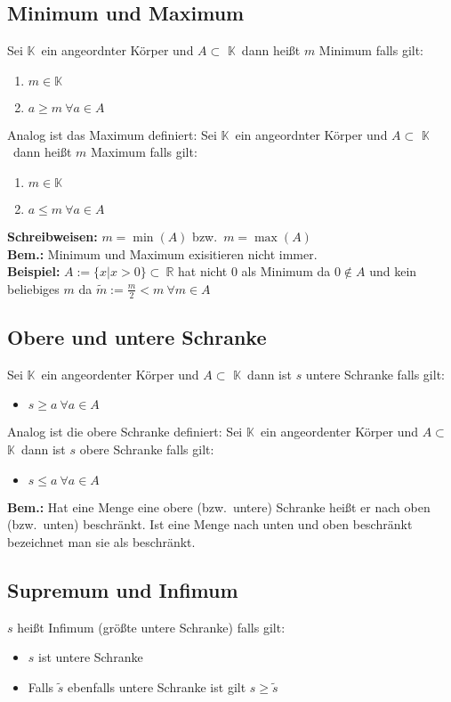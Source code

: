 \documentclass[10pt]{article}
\newcommand{\K}{$\mathbb{K}$}
\begin{document}
    \subsection{Minimum und Maximum}
    Sei \K\ ein angeordnter Körper und $A \subset$ \K\ dann heißt
    $m$ Minimum falls gilt:
    \begin{enumerate}
        \item $m \in \mathbb{K}$
        \item $a \geq m\ \forall a \in A$
    \end{enumerate}
    Analog ist das Maximum definiert:
    Sei \K\ ein angeordnter Körper und $A \subset$ \K\ dann heißt
    $m$ Maximum falls gilt:
    \begin{enumerate}
        \item $m \in \mathbb{K}$
        \item $a \leq m\ \forall a \in A$
    \end{enumerate}
    \textbf{Schreibweisen:}
    $m = \min{(A)}$ bzw.\ $m = \max{(A)}$\\
    \textbf{Bem.:}
    Minimum und Maximum exisitieren nicht immer.\\
    \textbf{Beispiel:} $A := \{x | x>0\}\subset\ \mathbb{R}$
    hat nicht 0 als Minimum da $0 \notin A$ und kein beliebiges $m$ da $\tilde{m} := \frac{m}{2} < m\ \forall m \in A$

    \subsection{Obere und untere Schranke}
    Sei \K\ ein angeordenter Körper und $A \subset$ \K\ dann ist $s$ untere
    Schranke falls gilt:
    \begin{itemize}
        \item $s \geq a\ \forall a \in A$
    \end{itemize}

     Analog ist die obere Schranke definiert:
    Sei \K\ ein angeordenter Körper und $A \subset$ \K\ dann ist $s$ obere
    Schranke falls gilt:
    \begin{itemize}
        \item $s \leq a\ \forall a \in A$
    \end{itemize}

    \textbf{Bem.:} Hat eine Menge eine obere (bzw.\ untere) Schranke
    heißt er nach oben (bzw.\ unten) beschränkt. Ist eine Menge nach unten und
    oben beschränkt bezeichnet man sie als beschränkt.

    \subsection{Supremum und Infimum}
    $s$ heißt Infimum (größte untere Schranke) falls gilt:
    \begin{itemize}
        \item $s$ ist untere Schranke
        \item Falls $\tilde{s}$ ebenfalls untere Schranke ist gilt
        $s\geq\tilde{s}$
    \end{itemize}
\end{document}
